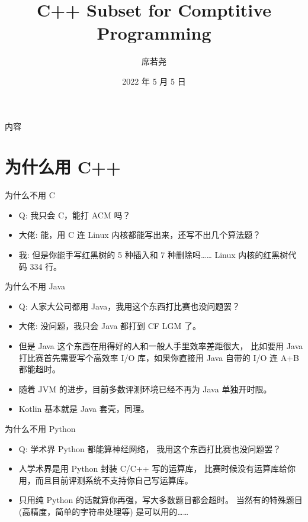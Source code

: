 \documentclass[10pt,mathserif]{beamer}
\title{C++ Subset for Comptitive Programming}
\institute{西安电子科技大学程序设计竞赛实训基地}
\author{席若尧}
\date{2022 年 5 月 5 日}
\begin{document}
%
{\xdbg {}}

\begin{frame}{内容}
	\tableofcontents[hideallsubsections]
\end{frame}

\section{为什么用 C++}
\sectionpage

\begin{frame}{为什么不用 C}
	\begin{itemize}
		\item Q: 我只会 C，能打 ACM 吗？
			\pause
		\item 大佬: 能，用 C 连 Linux 内核都能写出来，还写不出几个算法题？
			\pause
		\item 我: 但是你能手写红黑树的 5 种插入和 7 种删除吗……
			Linux 内核的红黑树代码 334 行。
	\end{itemize}
\end{frame}

\begin{frame}{为什么不用 Java}
	\begin{itemize}
		\item Q: 人家大公司都用 Java，我用这个东西打比赛也没问题罢？
			\pause
		\item 大佬: 没问题，我只会 Java 都打到 CF LGM 了。
			\pause
		\item 但是 Java 这个东西在用得好的人和一般人手里效率差距很大，
			比如要用 Java 打比赛首先需要写个高效率 I/O 库，如果你直接用
			Java 自带的 I/O 连 A+B 都能超时。
		\item 随着 JVM 的进步，目前多数评测环境已经不再为 Java 单独开时限。
			\pause
		\item Kotlin 基本就是 Java 套壳，同理。
	\end{itemize}
\end{frame}

\begin{frame}{为什么不用 Python}
	\begin{itemize}
		\item Q: 学术界 Python 都能算神经网络，
			我用这个东西打比赛也没问题罢？
		\item 人学术界是用 Python 封装 C/C++ 写的运算库，
			比赛时候没有运算库给你用，而且目前评测系统不支持你自己写运算库。
		\item 只用纯 Python 的话就算你再强，写大多数题目都会超时。
			当然有的特殊题目 (高精度，简单的字符串处理等) 是可以用的……
	\end{itemize}
\end{frame}
\end{document}
